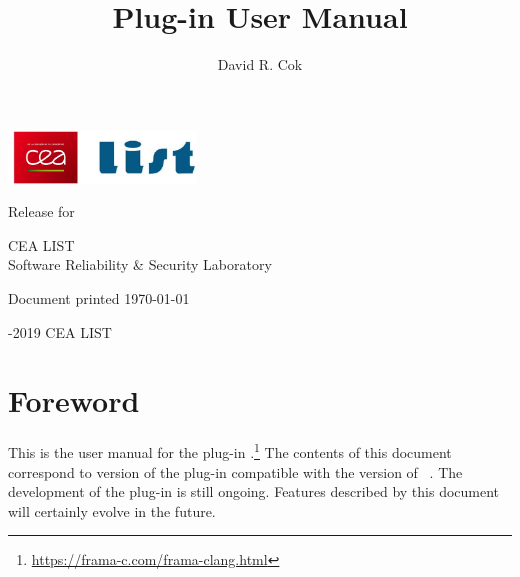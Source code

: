 \documentclass[web]{frama-c-book}
\begin{document}

\begin{titlepage}
\begin{flushleft}
\includegraphics[height=14mm]{cealistlogo.jpg}
\end{flushleft}
\vfill
\title{\fclang Plug-in User Manual}{Release \version for \fclang \fclangversion
}
\author{David R. Cok}
\begin{center}
CEA LIST\\ Software Reliability \& Security Laboratory
\end{center}
\begin{center}
	Document printed \ddMyyyydate\today
\end{center}
\vfill
\begin{flushleft}
  -2019 CEA LIST
\end{flushleft}
\end{titlepage}

\tableofcontents


\chapter*{Foreword}
\markright{}

This is the user manual for the \framac plug-in
\fclang.\footnote{\url{https://frama-c.com/frama-clang.html}} 
The contents of this
document correspond to version \fclangversion of the plug-in compatible with the
\fcversion version of \framac~\cite{userman,fac15}.  The development of
the \fclang plug-in is still ongoing.  Features described by this document will certainly
evolve in the future.
\end{document}

